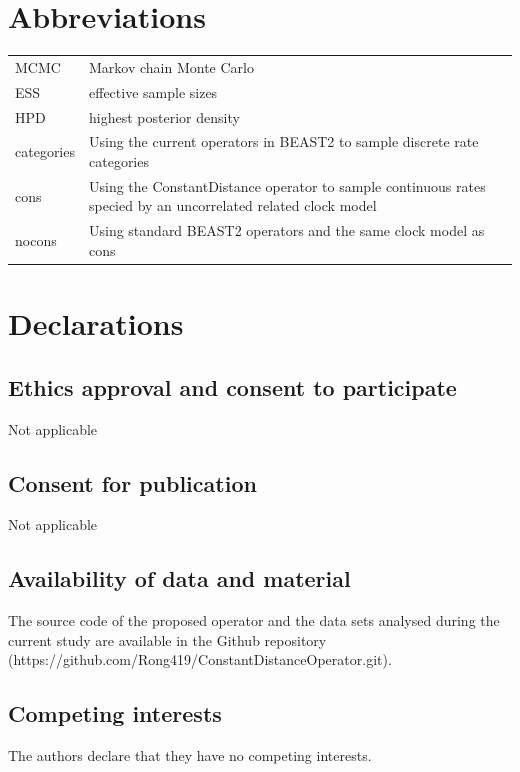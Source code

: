 \documentclass{bmcart}
\begin{document}
\begin{backmatter}
\section*{Abbreviations}
\begin{table}[h!]
\raggedright
\begin{tabular}{ll}
MCMC&Markov chain Monte Carlo\\
ESS&effective sample sizes\\ 
HPD&highest posterior density\\
categories & Using the current operators in BEAST2 to sample discrete rate categories\\
cons & Using the ConstantDistance operator to sample continuous rates specied by an uncorrelated related clock model\\
nocons & Using standard BEAST2 operators and the same clock model as cons
\end{tabular}
\end{table}

\section*{Declarations}
\subsection*{Ethics approval and consent to participate}
Not applicable

\subsection*{Consent for publication}
Not applicable

\subsection*{Availability of data and material}
The source code of the proposed operator and the data sets analysed during the current study are available in the Github repository (https://github.com/Rong419/ConstantDistanceOperator.git).  

\subsection*{Competing interests}
The authors declare that they have no competing interests.


\end{backmatter}
\end{document}
